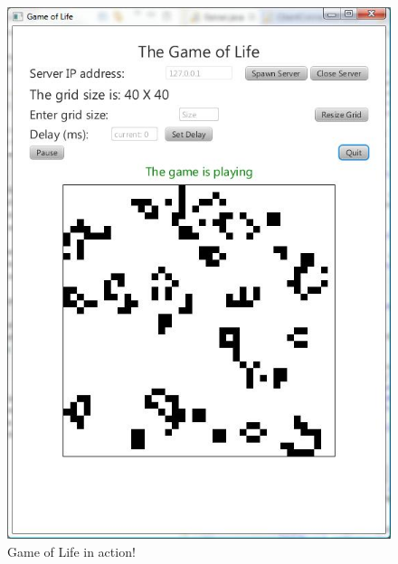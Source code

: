 \documentclass[final]{beamer}
\newlength{\onecolwid}
\newlength{\twocolwid}
\begin{document}
\begin{frame}[t]
\begin{columns}[t]
\begin{column}{\twocolwid}
\begin{columns}[t,totalwidth=\twocolwid] %

\begin{column}{\onecolwid}\vspace{-.6in} %


\begin{block}{}
\begin{figure}
\includegraphics[width=.7\linewidth]{gol.jpg}
\caption{Game of Life in action!}
\end{figure}
\end{block}


\end{column} %


\end{columns}
\end{column}
\end{columns}
\end{frame}
\end{document}
